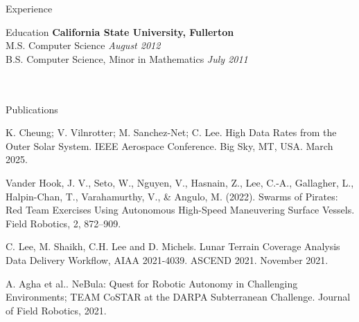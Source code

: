 \documentclass{resume} %
\begin{document}
\begin{rSection}{Experience}


\begin{rSection}{Education}
{\bf California State University, Fullerton}  \\ 
M.S. Computer Science \hfill {\em August 2012}\\
B.S. Computer Science, Minor in Mathematics  \hfill {\em July 2011}\\
\\
\\
\end{rSection}


\begin{rSection}{Publications}
\item K. Cheung; V. Vilnrotter; M. Sanchez-Net; C. Lee. High Data Rates from the Outer Solar System. IEEE Aerospace Conference. Big Sky, MT, USA. March 2025. 


\item Vander Hook, J. V., Seto, W., Nguyen, V., Hasnain, Z., Lee, C.-A., Gallagher,
L., Halpin-Chan, T., Varahamurthy, V., \& Angulo, M. (2022). Swarms of Pirates: Red Team Exercises Using
Autonomous High-Speed Maneuvering Surface Vessels. Field Robotics, 2, 872–909.

\item C. Lee, M. Shaikh, C.H. Lee and D. Michels. Lunar Terrain Coverage Analysis Data Delivery Workflow, AIAA 2021-4039. ASCEND 2021. November 2021.

\item A. Agha et al.. NeBula: Quest for Robotic Autonomy in Challenging Environments; TEAM CoSTAR at the DARPA Subterranean Challenge. Journal of Field Robotics, 2021.


\end{rSection}
\end{rSection}
\end{document}
